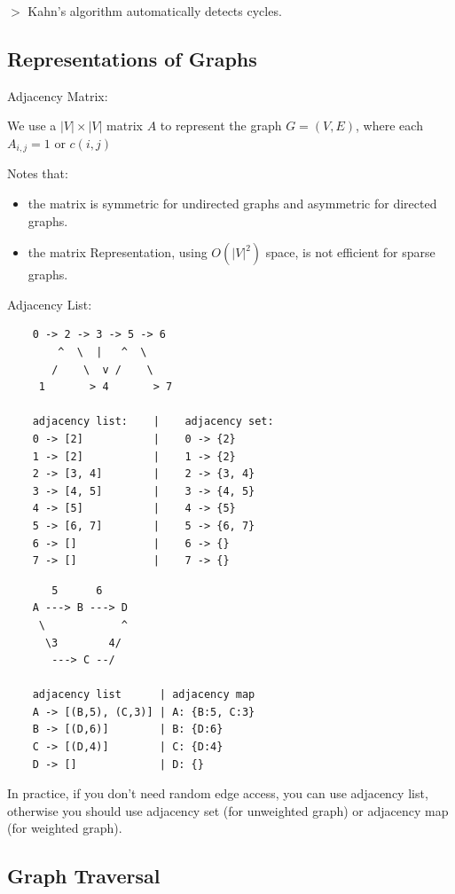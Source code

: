\documentclass[12pt,a4paper]{article}
\newcommand{\remark}[1]{
    {\small $>$ {\color{blue} #1}}
}
\begin{document}
\remark{Kahn's algorithm automatically detects cycles.}

\subsection*{Representations of Graphs}

Adjacency Matrix:

We use a $|V| \times |V|$ matrix $A$ to represent the graph $G = (V, E)$,
where each $A_{i,j} = 1 \text{ or } c(i, j)$

Notes that:

\begin{itemize}
    \item the matrix is symmetric for undirected graphs and asymmetric for directed graphs.
    \item the matrix Representation, using $O(|V|^2)$ space, is not efficient for sparse graphs.
\end{itemize}

Adjacency List:

\begin{verbatim}
    0 -> 2 -> 3 -> 5 -> 6
        ^  \  |   ^  \
       /    \  v /    \
     1       > 4       > 7

    adjacency list:    |    adjacency set:
    0 -> [2]           |    0 -> {2}
    1 -> [2]           |    1 -> {2}
    2 -> [3, 4]        |    2 -> {3, 4}
    3 -> [4, 5]        |    3 -> {4, 5}
    4 -> [5]           |    4 -> {5}
    5 -> [6, 7]        |    5 -> {6, 7}
    6 -> []            |    6 -> {}
    7 -> []            |    7 -> {}
\end{verbatim}

\begin{verbatim}
       5      6
    A ---> B ---> D
     \            ^
      \3        4/
       ---> C --/

    adjacency list      | adjacency map
    A -> [(B,5), (C,3)] | A: {B:5, C:3}
    B -> [(D,6)]        | B: {D:6}
    C -> [(D,4)]        | C: {D:4}
    D -> []             | D: {}
\end{verbatim}

In practice, if you don't need random edge access, 
you can use adjacency list, otherwise you should use adjacency set (for unweighted graph) or adjacency map (for weighted graph).

\subsection*{Graph Traversal}
\end{document}
